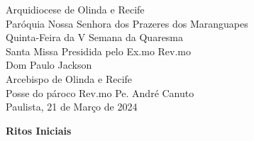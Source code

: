 \documentclass{book}
\begin{document}
\begin{center}
    \LARGE Arquidiocese de Olinda e Recife
    \vspace{.2cm} \\
    \Large Paróquia Nossa Senhora dos Prazeres dos Maranguapes
    \vspace{5cm} \\
    \textcolor{VioletRed2}{\huge Quinta-Feira da V Semana da Quaresma}
    \vspace{5cm} \\
    \Large Santa Missa Presidida pelo Ex.mo Rev.mo
    \vspace{.2cm} \\
    \textcolor{VioletRed2}{\huge Dom Paulo Jackson}
    \vspace{.2cm} \\
    \Large Arcebispo de Olinda e Recife
    \vspace{.5cm} \\
    \Large Posse do pároco Rev.mo Pe. André Canuto
    \vspace{.2cm}
    \vspace{\fill}\\
    \Large Paulista, 21 de Março de 2024
\end{center}
\cleardoublepage{}
\begin{center}
    \textbf{Ritos Iniciais}
\end{center}
\end{document}
